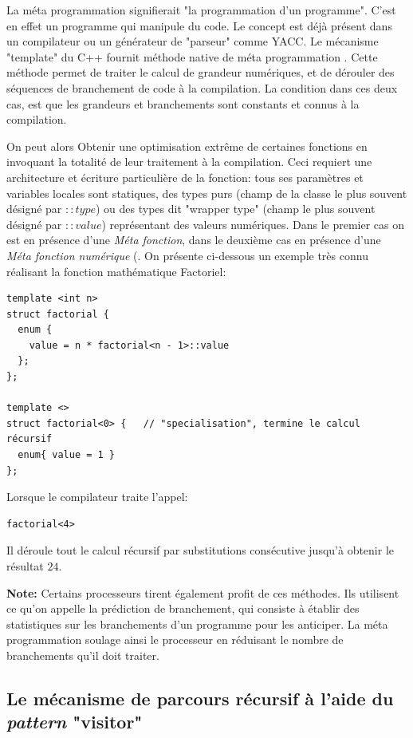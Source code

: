 \documentclass{report}
\begin{document}
La méta programmation signifierait "la programmation d'un programme". C'est en effet un programme qui manipule du code. Le concept est déjà présent dans un compilateur ou un générateur de "parseur" comme YACC. Le mécanisme "template" du C++ fournit méthode native de méta programmation \cite[p2,3]{bib_metaprogramming}. Cette méthode permet de traiter le calcul de grandeur numériques, et de dérouler des séquences de branchement de code à la compilation. La condition dans ces deux cas, est que les grandeurs et branchements sont constants et connus à la compilation.

On peut alors Obtenir une optimisation extrême de certaines fonctions en invoquant la totalité de leur traitement à la compilation. Ceci requiert une architecture et écriture particulière de la fonction: tous ses paramètres et variables locales sont statiques, des types purs (champ de la classe le plus souvent désigné par $::type$) ou des types dit "wrapper type" (champ le plus souvent désigné par $::value$) représentant des valeurs numériques. Dans le premier cas on est en présence d'une \emph{Méta fonction}, dans le deuxième cas en présence d'une \emph{Méta fonction numérique} (\cite[(2.9)]{bib_metaprogramming}. On présente ci-dessous un exemple très connu réalisant la fonction mathématique Factoriel:

\begin{verbatim}
template <int n>
struct factorial {
  enum {
    value = n * factorial<n - 1>::value
  };
};

template <>
struct factorial<0> {   // "specialisation", termine le calcul récursif
  enum{ value = 1 }
};
\end{verbatim} 

Lorsque le compilateur traite l'appel:

\begin{verbatim}
factorial<4>
\end{verbatim}

Il déroule tout le calcul récursif par substitutions consécutive jusqu'à obtenir le résultat $24$.

\textbf{Note:} Certains processeurs tirent également profit de ces méthodes. Ils utilisent ce qu'on appelle la prédiction de branchement, qui consiste à établir des statistiques sur les branchements d'un programme pour les anticiper. La méta programmation soulage ainsi le processeur en réduisant le nombre de branchements qu'il doit traiter.  

\subsection{Le mécanisme de parcours récursif à l'aide du \emph{pattern} "visitor"} \label{ch_concepts_visiteurs}
\end{document}
